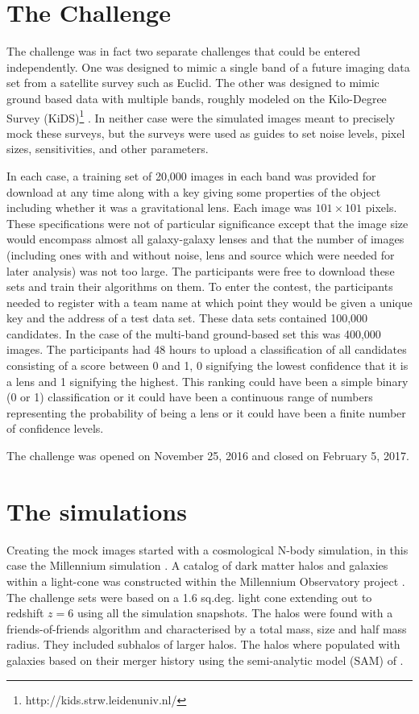 \documentclass{aa}
\begin{document}
\section{The Challenge}
\label{sec:challenge}

The challenge was in fact two separate challenges that could be entered independently.  One was designed to mimic a single band of a future imaging data set from a satellite survey such as Euclid.  The other was designed to mimic ground based data with multiple bands, roughly modeled on the Kilo-Degree Survey (KiDS)\footnote{http://kids.strw.leidenuniv.nl/} \citep{2013ExA....35...25D}. In neither case were the simulated images meant to precisely mock these surveys, but the surveys were used as guides to set noise levels, pixel sizes, sensitivities, and other parameters.

In each case, a training set of 20,000 images in each band was provided for download at any time along with a key giving some properties of the object including whether it was a gravitational lens.  Each image was $101\times101$ pixels.  These specifications were not of particular significance except that the image size would encompass almost all galaxy-galaxy lenses and that the number of images (including ones with and without noise, lens and source which were needed for later analysis) was not too large.
The participants were free to download these sets and train their algorithms on them.  To enter the contest, the participants needed to register with a team name at which point they would be given a unique key and the address of a test data set.  These data sets contained 100,000 candidates.  In the case of the multi-band ground-based set this was 400,000 images. The participants had 48 hours to upload a classification of all candidates consisting of a score between 0 and 1, 0 signifying the lowest confidence that it is a lens and 1 signifying the highest.  This ranking could have been a simple binary (0 or 1) classification  or it could have been a continuous range of numbers representing the probability of being a lens or it could have been a finite number of confidence levels.  

The challenge was opened on November 25, 2016 and closed on February 5, 2017.

\section{The simulations}
\label{sec:simulation}

Creating the mock images started with a cosmological N-body simulation, in this case the Millennium simulation \citep{2009MNRAS.398.1150B}.   A catalog of dark matter halos and galaxies  within a light-cone was constructed within the Millennium Observatory project \citep{2013MNRAS.428..778O}.   The challenge sets were based on a 1.6 sq.deg. light cone extending out to redshift $z=6$ using all the simulation snapshots.  The halos were found with a friends-of-friends algorithm and characterised by a total mass, size and half mass radius.  They included subhalos of larger halos.  The halos where populated with galaxies based on their merger history using the semi-analytic model  (SAM) of \cite{2011MNRAS.413..101G}.
\end{document}
